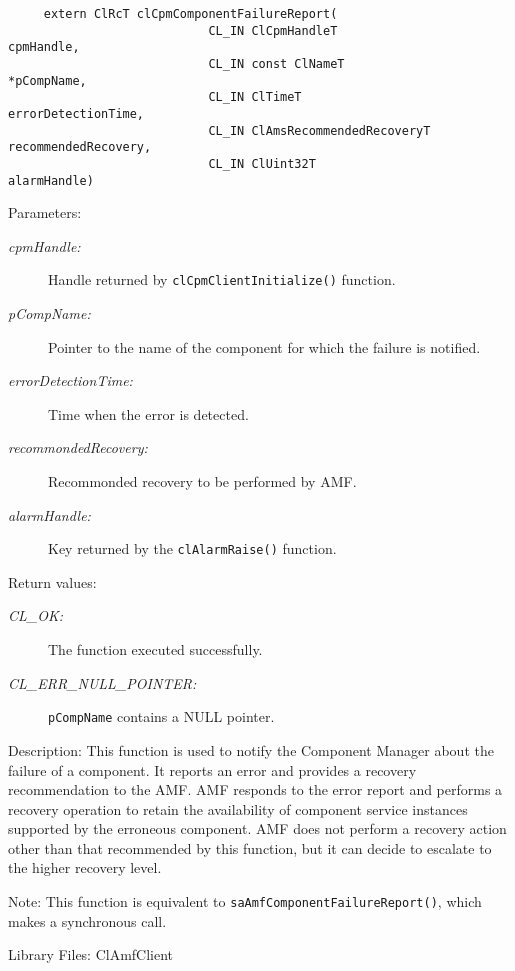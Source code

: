 {\begin{Desc}
\footnotesize\begin{verbatim}     extern ClRcT clCpmComponentFailureReport(
                			CL_IN ClCpmHandleT                cpmHandle,
                			CL_IN const ClNameT               *pCompName,
                			CL_IN ClTimeT                     errorDetectionTime,
                			CL_IN ClAmsRecommendedRecoveryT   recommendedRecovery,
                			CL_IN ClUint32T                   alarmHandle)
\end{verbatim}
\normalsize
\end{Desc}
\begin{Desc}
\item[Parameters:]
\begin{description}
\item[{\em cpm\-Handle:}]Handle returned by {\tt{cl\-Cpm\-Client\-Initialize()}} function. 
\item[{\em p\-Comp\-Name:}]Pointer to the name of the component for which the failure is notified. 
\item[{\em error\-Detection\-Time:}]Time when the error is detected. 
\item[{\em recommonded\-Recovery:}]Recommonded recovery to be performed by AMF. 
\item[{\em alarm\-Handle:}]Key returned by the {\tt{cl\-Alarm\-Raise()}} function.
\end{description}
\end{Desc}
\begin{Desc}
\item[Return values:]
\begin{description}
\item[{\em CL\_\-OK:}]The function executed successfully. 
\item[{\em CL\_\-ERR\_\-NULL\_\-POINTER:}]{\tt{pCompName}} contains a NULL pointer.
\end{description}
\end{Desc}
\begin{Desc}
\item[Description:]This function is used to notify the Component Manager about the failure of a component. It reports an error and provides a recovery 
recommendation to the AMF. AMF responds to the error report and performs a recovery operation to retain the availability of component service instances
supported by the erroneous component. AMF does not perform a recovery action other than that recommended by this function, but it can decide to escalate
to the higher recovery level.\end{Desc}
\begin{Desc}
\item[Note:]This function is equivalent to {\tt{sa\-Amf\-Component\-Failure\-Report()}}, which makes a synchronous call.\end{Desc}
\begin{Desc}
\item[Library Files:]Cl\-Amf\-Client\end{Desc}

}

